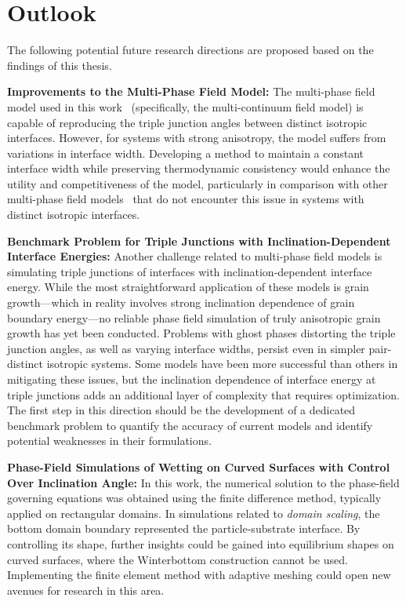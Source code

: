 \section{Outlook}

The following potential future research directions are proposed based on the findings of this thesis.

\textbf{Improvements to the Multi-Phase Field Model:} The multi-phase field model used in this work~\cite{Moelans2008, Minar2022} (specifically, the multi-continuum field model) is capable of reproducing the triple junction angles between distinct isotropic interfaces. However, for systems with strong anisotropy, the model suffers from variations in interface width. Developing a method to maintain a constant interface width while preserving thermodynamic consistency would enhance the utility and competitiveness of the model, particularly in comparison with other multi-phase field models~\cite{Steinbach1999, Nestler2005} that do not encounter this issue in systems with distinct isotropic interfaces.

\textbf{Benchmark Problem for Triple Junctions with Inclination-Dependent Interface Energies:} Another challenge related to multi-phase field models is simulating triple junctions of interfaces with inclination-dependent interface energy. While the most straightforward application of these models is grain growth—which in reality involves strong inclination dependence of grain boundary energy—no reliable phase field simulation of truly anisotropic grain growth has yet been conducted. Problems with ghost phases distorting the triple junction angles, as well as varying interface widths, persist even in simpler pair-distinct isotropic systems. Some models have been more successful than others in mitigating these issues, but the inclination dependence of interface energy at triple junctions adds an additional layer of complexity that requires optimization. The first step in this direction should be the development of a dedicated benchmark problem to quantify the accuracy of current models and identify potential weaknesses in their formulations.

\textbf{Phase-Field Simulations of Wetting on Curved Surfaces with Control Over Inclination Angle:} In this work, the numerical solution to the phase-field governing equations was obtained using the finite difference method, typically applied on rectangular domains. In simulations related to \textit{domain scaling}, the bottom domain boundary represented the particle-substrate interface. By controlling its shape, further insights could be gained into equilibrium shapes on curved surfaces, where the Winterbottom construction cannot be used. Implementing the finite element method with adaptive meshing could open new avenues for research in this area. 


